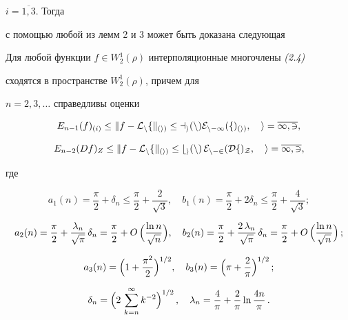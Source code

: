 $i=\overline{1,3}$. Тогда


с помощью любой из лемм 2 и 3 может быть доказана следующая





\begin{thm}


Для любой функции $f\in W{}_2^1(\rho )$ интерполяционные многочлены {\em (2.4)}


сходятся в пространстве $W_2^1(\rho )$, причем для 


$n=2,3,\dotsc $ справедливы оценки


\begin{equation}


E_{n-1}(f)_{(i)}\le \|f-\cal L_nf\|_{(i)}\le a_i(n)


E_{n-1}(f)_{(i)}, \quad i=\overline{1,3},


\end{equation}


%


\begin{equation}


E_{n-2}(Df)_Z\le \|f-\cal L_nf\|_{(i)}\le


b_i(n)\, E_{n-2}(Df)_Z,\quad i=\overline{1,3},


\end{equation}


где


$$


a_1(n)=\frac{\pi}{2} +\delta_n\le \frac{\pi}{2}+\frac{2}{\sqrt{3}} ,\quad


b_1(n)=\frac{\pi}{2} +2\delta_n\le \frac{\pi}{2}+\frac{4}{\sqrt{3}};


$$


$$


a_2(n)=\frac{\pi}{2} +\frac{\lambda_n}{\sqrt{\pi}}\, \delta_n =


\frac{\pi}{2}+O\, \Bigl( \frac{\ln n}{\sqrt{n}}\Bigr),\quad


b_2(n)=\frac{\pi}{2} +\frac{2\, \lambda_n}{\sqrt{\pi}}\, \delta_n =


\frac{\pi}{2}+O\, \Bigl( \frac{\ln n}{\sqrt{n}}\Bigr)\, ;


$$


$$


a_3(n)=\Bigl(1+\frac{\pi^2}{2}\Bigr)^{1/2}, \quad


b_3(n)=\Bigl(\pi +\frac{2}{\pi}\Bigr)^{1/2}\, ;


$$


$$


\delta_n=\Bigl( 2\, \sum_{k=n}^\infty k^{-2}\Bigr)^{1/2}\, ,\quad


\lambda_n=\frac{4}{\pi} +\frac{2}{\pi}\ln \frac{4n}{\pi}\, .


$$


\end{thm}





